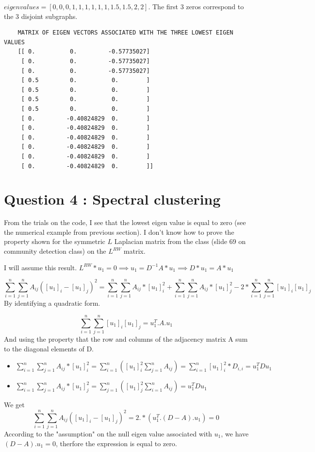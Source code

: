 \documentclass[a4paper]{article}
\begin{document}
$eigen values = [0, 0, 0, 1 , 1, 1, 1, 1, 1, 1.5, 1.5, 2, 2]$. 
The first 3 zeros correspond to the 3 disjoint subgraphs.


\begin{verbatim}
    MATRIX OF EIGEN VECTORS ASSOCIATED WITH THE THREE LOWEST EIGEN VALUES
    [[ 0.          0.         -0.57735027]
     [ 0.          0.         -0.57735027]
     [ 0.          0.         -0.57735027]
     [ 0.5         0.          0.        ]
     [ 0.5         0.          0.        ]
     [ 0.5         0.          0.        ]
     [ 0.5         0.          0.        ]
     [ 0.         -0.40824829  0.        ]
     [ 0.         -0.40824829  0.        ]
     [ 0.         -0.40824829  0.        ]
     [ 0.         -0.40824829  0.        ]
     [ 0.         -0.40824829  0.        ]
     [ 0.         -0.40824829  0.        ]]     
\end{verbatim}

\section{Question 4 : Spectral clustering}
From the trials on the code, I see that the lowest eigen value is equal to zero (see the numerical example from previous section).
I don't know how to prove the property shown for the symmetric $L$ Laplacian matrix from the class (slide 69 on community detection class) on the $L^{RW}$ matrix.

I will assume this result.
$L^{RW}*u_1 = 0 \implies u_1 = D^{-1}A*u_1 \implies D*u_1 = A*u_1$

\begin{equation}
\sum_{i=1}^{n}\sum_{j=1}^{n}A_{ij}([u_1]_i - [u_1]_j)^2 = 
\sum_{i=1}^{n}\sum_{j=1}^{n}A_{ij}*[u_1]_i^2 +
\sum_{i=1}^{n}\sum_{j=1}^{n}A_{ij}*[u_1]_j^2 -2*
\sum_{i=1}^{n}\sum_{j=1}^{n}[u_1]_i[u_1]_j
\end{equation}
By identifying a quadratic form.

\begin{equation}
\sum_{i=1}^{n}\sum_{j=1}^{n}[u_1]_i[u_1]_j = u_1^T.A.u_1
\end{equation}
And using the property that the row and columns of the adjacency matrix A sum to the diagonal elements of D.
\begin{itemize}
    \item $\sum_{i=1}^{n}\sum_{j=1}^{n}A_{ij}*[u_1]_i^2 = \sum_{i=1}^{n}([u_1]_i^2\sum_{j=1}^{n}A_{ij})=\sum_{i=1}^{n}[u_1]_i^2*D_{i,i}=u_1^TDu_1$
    \item $\sum_{i=1}^{n}\sum_{j=1}^{n}A_{ij}*[u_1]_j^2 = \sum_{j=1}^{n}([u_1]_j^2\sum_{i=1}^{n}A_{ij})=u_1^TDu_1$
\end{itemize}
We get 
\begin{equation}
    \sum_{i=1}^{n}\sum_{j=1}^{n}A_{ij}([u_1]_i - [u_1]_j)^2= 2.*(u_1^T.(D-A).u_1) = 0
\end{equation}
According to the "assumption" on the null eigen value associated with $u_1$, we have $(D-A).u_1 = 0$, therfore the expression is equal to zero.
\end{document}
